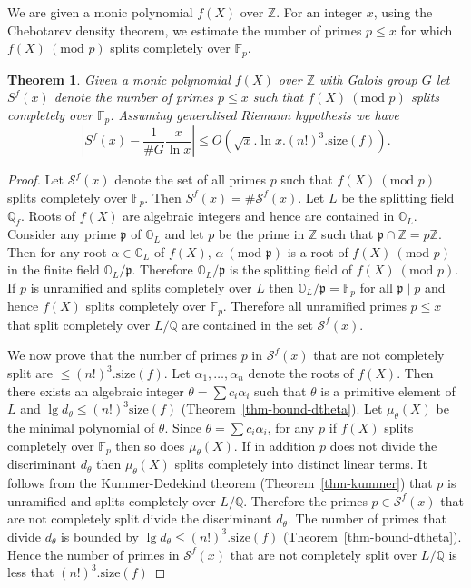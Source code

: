 \documentclass[11pt]{madras}%
\newtheorem{theorem}{Theorem}[chapter]
\theoremstyle{remark}
\newcommand{\size}[1]{{\ensuremath{\mathrm{size}\left(#1\right)}}}
\newcommand{\Ideal}[1]{{\ensuremath{\mathfrak{#1}}}}
\newcommand{\Int}[1][]{{\ensuremath{\mathbb{O}_{#1}}}}
\begin{document}
We are given a monic polynomial $f(X)$ over $\mathbb{Z}$. For an
integer $x$, using the Chebotarev density theorem, we estimate the
number of primes $p \leq x$ for which $f(X)\ (\textrm{mod } p)$ splits
completely over $\mathbb{F}_p$.

\begin{theorem}\label{thm-sfx}
  Given a monic polynomial $f(X)$ over $\mathbb{Z}$ with Galois group
  $G$ let $S^f(x)$ denote the number of primes $p \leq x$ such that
  $f(X)\ (\textrm{mod } p)$ splits completely over $\mathbb{F}_p$.
  Assuming generalised Riemann hypothesis we have
  \[ 
  \left| S^f(x) - \frac{1}{\# G} \frac{x}{\ln{x}} \right| \leq
  O\left(\sqrt{x}. \ln{x} .(n!)^3. \size{f}\right).
  \]
\end{theorem}
\begin{proof}
  Let $\mathcal{S}^f(x)$ denote the set of all primes $p$ such that
  $f(X)\ (\textrm{mod } p)$ splits completely over $\mathbb{F}_p$.
  Then $S^f(x) = \# \mathcal{S}^f(x)$. Let $L$ be the splitting field
  $\mathbb{Q}_f$.  Roots of $f(X)$ are algebraic integers and hence
  are contained in $\Int[L]$. Consider any prime $\Ideal{p}$ of
  $\Int[L]$ and let $p$ be the prime in $\mathbb{Z}$ such that
  $\Ideal{p} \cap \mathbb{Z} = p \mathbb{Z}$. Then for any root
  $\alpha \in \Int[L]$ of $f(X)$, $\alpha\ (\textrm{mod }\Ideal{p})$
  is a root of $f(X)\ (\textrm{mod } p)$ in the finite field
  $\Int[L]/\Ideal{p}$. Therefore $\Int[L]/\Ideal{p}$ is the splitting
  field of $f(X)\ (\textrm{mod } p)$. If $p$ is unramified and splits
  completely over $L$ then $\Int[L]/\Ideal{p} = \mathbb{F}_p$ for all
  $\Ideal{p} \mid p$ and hence $f(X)$ splits completely over
  $\mathbb{F}_p$. Therefore all unramified primes $p \leq x$ that
  split completely over $L/\mathbb{Q}$ are contained in the set
  $\mathcal{S}^f(x)$.

  We now prove that the number of primes $p$ in $\mathcal{S}^f(x)$
  that are not completely split are $\leq (n!)^3.\size{f}$.  Let
  $\alpha_1,\ldots,\alpha_n$ denote the roots of $f(X)$. Then there
  exists an algebraic integer $\theta = \sum c_i \alpha_i$ such that
  $\theta$ is a primitive element of $L$ and $\lg{d_\theta} \leq
  (n!)^3 \size{f}$ (Theorem~\ref{thm-bound-dtheta}). Let
  $\mu_\theta(X)$ be the minimal polynomial of $\theta$. Since $\theta
  = \sum c_i \alpha_i$, for any $p$ if $f(X)$ splits completely over
  $\mathbb{F}_p$ then so does $\mu_\theta(X)$.  If in addition $p$
  does not divide the discriminant $d_\theta$ then $\mu_\theta(X)$
  splits completely into distinct linear terms.  It follows from the
  Kummer-Dedekind theorem (Theorem~\ref{thm-kummer}) that $p$ is
  unramified and splits completely over $L/\mathbb{Q}$. Therefore the
  primes $p \in \mathcal{S}^f(x)$ that are not completely split divide
  the discriminant $d_\theta$.  The number of primes that divide
  $d_\theta$ is bounded by $\lg{d_\theta} \leq (n!)^3.\size{f}$
  (Theorem~\ref{thm-bound-dtheta}). Hence the number of primes in
  $\mathcal{S}^f(x)$ that are not completely split over $L/\mathbb{Q}$
  is less that $(n!)^3.\size{f}$


\end{proof}
\end{document}
